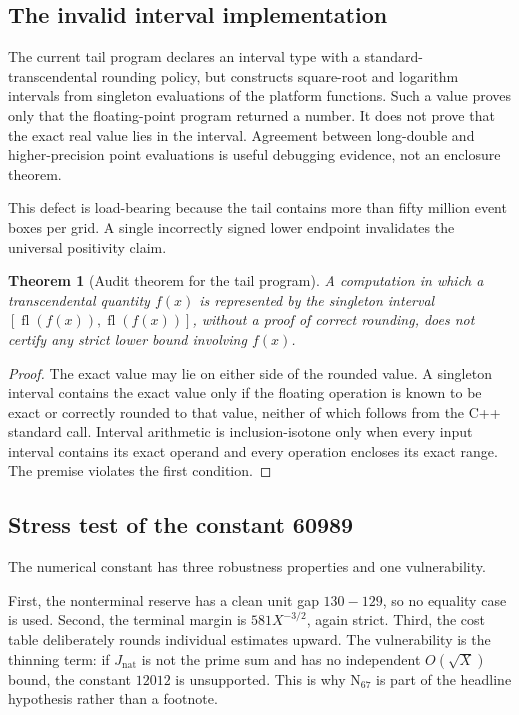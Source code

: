 \documentclass[11pt]{article}
\newtheorem{theorem}{Theorem}[section]
\theoremstyle{definition}
\theoremstyle{remark}
\newcommand{\1}{\mathbf 1}
\newcommand{\Nat}{\mathrm{nat}}
\begin{document}
\subsection{The invalid interval implementation}

The current tail program declares an interval type with a standard-transcendental rounding policy, but constructs square-root and logarithm intervals from singleton evaluations of the platform functions.  Such a value proves only that the floating-point program returned a number.  It does not prove that the exact real value lies in the interval.  Agreement between long-double and higher-precision point evaluations is useful debugging evidence, not an enclosure theorem.

This defect is load-bearing because the tail contains more than fifty million event boxes per grid.  A single incorrectly signed lower endpoint invalidates the universal positivity claim.

\begin{theorem}[Audit theorem for the tail program]\label{thm:tail-invalid}
A computation in which a transcendental quantity \(f(x)\) is represented by the singleton interval \([\operatorname{fl}(f(x)),\operatorname{fl}(f(x))]\), without a proof of correct rounding, does not certify any strict lower bound involving \(f(x)\).
\end{theorem}

\begin{proof}
The exact value may lie on either side of the rounded value.  A singleton interval contains the exact value only if the floating operation is known to be exact or correctly rounded to that value, neither of which follows from the C++ standard call.  Interval arithmetic is inclusion-isotone only when every input interval contains its exact operand and every operation encloses its exact range.  The premise violates the first condition.
\end{proof}

\subsection{Stress test of the constant 60989}

The numerical constant has three robustness properties and one vulnerability.

First, the nonterminal reserve has a clean unit gap \(130-129\), so no equality case is used.  Second, the terminal margin is \(581X^{-3/2}\), again strict.  Third, the cost table deliberately rounds individual estimates upward.  The vulnerability is the thinning term: if \(J_{\Nat}\) is not the prime sum and has no independent \(O(\sqrt X)\) bound, the constant \(12012\) is unsupported.  This is why \(\mathrm N_{67}\) is part of the headline hypothesis rather than a footnote.
\end{document}
